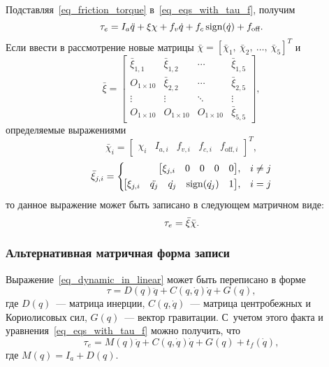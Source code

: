 Подставляя~\eqref{eq_friction_torque} в~\eqref{eq_eqs_with_tau_f}, получим
\begin{equation}
     \tau_e = I_a \ddot{q} + \xi \chi + f_v \dot{q} + f_c \operatorname{sign}(\dot{q}) + f_\text{off}\ldotp
\end{equation}
Если ввести в рассмотрение новые матрицы $\bar{\chi}=[\bar{\chi}_1, \: \bar\chi_2, \: \ldots, \: \bar\chi_5]^T$ и\linebreak
\begin{equation}
    \bar\xi =
    \begin{bmatrix}
        \bar\xi_{1,1} & \bar\xi_{1,2} & \cdots & \bar\xi_{1,5} \\
        O_{1 \times 10} & \bar\xi_{2,2} & \cdots & \bar\xi_{2,5} \\
        \vdots & \vdots & \ddots & \vdots \\
        O_{1 \times 10} & O_{1 \times 10} & O_{1 \times 10} & \bar\xi_{5,5}
    \end{bmatrix}\!\!,
\end{equation}
определяемые выражениями
\begin{equation}
    \bar{\chi}_i =
    \begin{bmatrix}
        \chi_i & I_{a,i} & f_{v,i} & f_{c,i} & f_{\text{off},i}
    \end{bmatrix}^T\!\!\!\!,
\end{equation}
\begin{equation}
    \bar{\xi}_{j,i} =
    \left\{
    \begin{aligned}
        \!\begin{bmatrix}\xi_{j,i} & 0 & 0 & 0 & 0\end{bmatrix}&, && i \ne j \\
        \!\begin{bmatrix}\xi_{j,i} & \ddot{q_j} & \dot{q_j} & \operatorname{sign}(\dot{q_j}) & 1\end{bmatrix}&, &&i = j
	\end{aligned}
	\right.
\end{equation}
то данное выражение может быть записано в следующем матричном виде:
\begin{equation}\label{eq_extended_dynamic_in_linear}
    \tau_e = \bar\xi \bar\chi \ldotp
\end{equation}

\subsubsection{Альтернативная матричная форма записи}
Выражение~\eqref{eq_dynamic_in_linear} может быть переписано в форме
\begin{equation}
    \tau = D(q) \ddot{q} + C(q,\dot{q}) \dot{q} + G(q),
\end{equation}
где $D(q)$~--- матрица инерции, $C(q,\dot{q})$~--- матрица центробежных и Кориолисовых сил, $G(q)$~--- вектор гравитации.
С~учетом этого факта и уравнения~\eqref{eq_eqs_with_tau_f} можно получить, что
\begin{equation}\label{eq_model_with_standard_matrix}
    \tau_e = M(q) \ddot{q} + C(q,\dot{q}) \dot{q} + G(q) + t_f(\dot{q}),
\end{equation}
где $M(q) = I_a + D(q)$.

